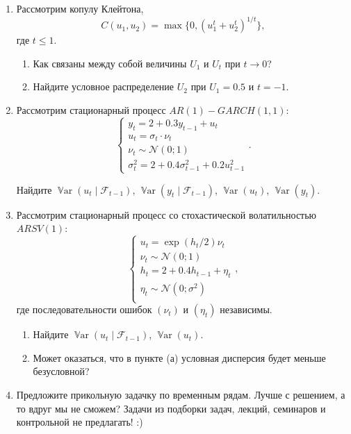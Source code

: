 \documentclass[12pt]{article}
\DeclareMathOperator{\Var}{\mathbb{V}ar}
\newcommand \cN{\mathcal{N}}
\newcommand{\cF}{\mathcal{F}}
\begin{document}
\begin{enumerate}
\item Рассмотрим копулу Клейтона, 
\[
C(u_1, u_2) = \max\{0, (u_1^t + u_2^t)^{1/t} \},    
\]
где $t \leq 1$. 
\begin{enumerate}
    \item Как связаны между собой величины $U_1$ и $U_t$ при $t\to 0$?
    \item Найдите условное распределение $U_2$ при $U_1 = 0.5$ и $t = -1$.
\end{enumerate}

\item Рассмотрим стационарный процесс $AR(1)-GARCH(1,1)$:
\[
\begin{cases}
y_t = 2 + 0.3 y_{t-1} + u_t \\
u_t = \sigma_t \cdot \nu_t \\
\nu_t \sim \cN(0;1) \\
\sigma^2_t = 2 + 0.4 \sigma^2_{t-1} + 0.2u_{t-1}^2
\end{cases}.
\]

Найдите $\Var(u_t \mid \cF_{t-1})$, $\Var(y_t \mid \cF_{t-1})$, $\Var(u_t)$, $\Var(y_t)$.

\item Рассмотрим стационарный процесс со стохастической волатильностью $ARSV(1)$:
\[
\begin{cases}
u_t = \exp(h_t/2) \nu_t \\
\nu_t \sim \cN(0;1) \\
h_t = 2 + 0.4 h_{t-1} + \eta_t \\
\eta_t \sim \cN(0;\sigma^2) \\
\end{cases},
\]
где последовательности ошибок $(\nu_t)$ и $(\eta_t)$ независимы. 

\begin{enumerate}
    \item Найдите $\Var(u_t \mid \cF_{t-1})$, $\Var(u_t)$.
    \item Может оказаться, что в пункте (а) условная дисперсия будет меньше безусловной?
\end{enumerate}



\item Предложите прикольную задачку по временным рядам. 
Лучше с решением, а то вдруг мы не сможем?
Задачи из подборки задач, лекций, семинаров и контрольной не предлагать! :)


\end{enumerate}
\end{document}
